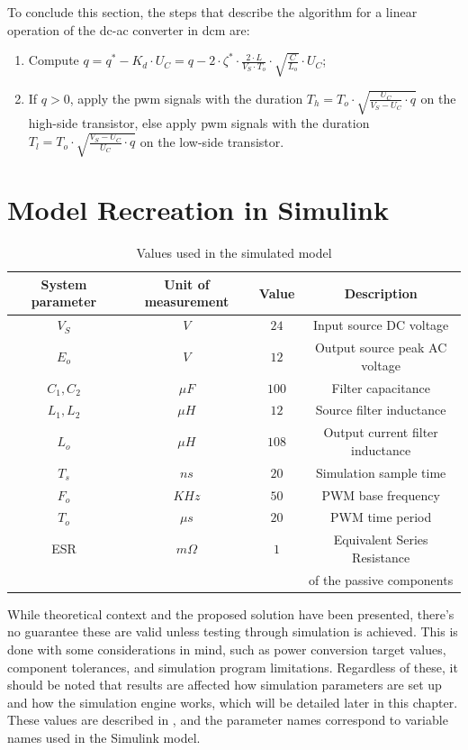 To conclude this section, the steps that describe the algorithm for a linear operation of the \gls{dc}-\gls{ac} converter in \gls{dcm} are:
\begin{enumerate}
    \item Compute $q = q^* - K_d \cdot U_C = q - 2 \cdot \zeta^* \cdot \frac{2 \cdot L}{V_S \cdot T_o} \cdot \sqrt{\frac{C}{L_o}} \cdot U_C$;
    \item If $q > 0$, apply the \gls{pwm} signals with the duration $T_h = T_o \cdot \sqrt{\frac{U_C}{V_S - U_C} \cdot q}$ on the high-side transistor, else apply \gls{pwm} signals with the duration $T_l = T_o \cdot \sqrt{\frac{V_S - U_C}{U_C} \cdot q}$ on the low-side transistor.
\end{enumerate}

\section{Model Recreation in Simulink}
\label{sec:simrec}

\begin{table}[ht!]
\begin{center}
\begin{tabular}{|c|c|c|c|}
\hline
System parameter&Unit of measurement&Value&Description\\ \hline
$V_S$&$V$&$24$&Input source DC voltage\\ \hline
$E_o$&$V$&$12$&Output source peak AC voltage\\ \hline
$C_1, C_2$&$\mu F$&$100$&Filter capacitance\\ \hline
$L_1, L_2$&$\mu H$&$12$&Source filter inductance\\ \hline
$L_o$&$\mu H$&$108$&Output current filter inductance\\ \hline
$T_s$&$ns$&$20$&Simulation sample time\\ \hline
$F_o$&$KHz$&$50$&PWM base frequency\\ \hline
$T_o$&$\mu s$&$20$&PWM time period\\ \hline
ESR&$m\Omega$&$1$&Equivalent Series Resistance \\
&&&of the passive components\\ \hline
\end{tabular}
\end{center}
\caption{Values used in the simulated model}
\label{tab:simvals}
\end{table}
While theoretical context and the proposed solution have been presented, there's no guarantee these are valid unless testing through simulation is achieved.
This is done with some considerations in mind, such as power conversion target values, component tolerances, and simulation program limitations.
Regardless of these, it should be noted that results are affected how simulation parameters are set up and how the simulation engine works, which will be detailed later in this chapter.
These values are described in , and the parameter names correspond to variable names used in the Simulink model.

